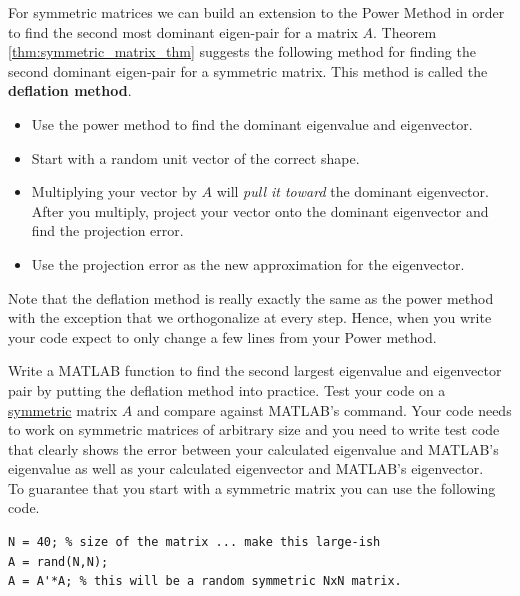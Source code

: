\begin{problem}
    For symmetric matrices we can build an extension to the Power Method in order
    to find the second most dominant eigen-pair for a matrix $A$.  Theorem
    \ref{thm:symmetric_matrix_thm} suggests the following method for finding the second
    dominant eigen-pair for a symmetric matrix.  This method is called the {\bf deflation
    method}.
    \begin{itemize}
        \item Use the power method to find the dominant eigenvalue and eigenvector.
        \item Start with a random unit vector of the correct shape.
        \item Multiplying your vector by $A$ will {\it pull it toward} the dominant
            eigenvector.  After you multiply, project your vector onto the dominant
            eigenvector and find the projection error.  
        \item Use the projection error as the new approximation for the eigenvector.
    \end{itemize}    

    Note that the deflation method is really exactly the same as the power method with the
    exception that we orthogonalize at every step.  Hence, when you write your code expect
    to only change a few lines from your Power method.

    Write a
    MATLAB function  to find the second largest eigenvalue and
    eigenvector pair by putting the deflation method into practice. Test your code on a
    \underline{symmetric} matrix $A$ and compare against MATLAB's  command.
    Your code needs to work on symmetric matrices of arbitrary size and you need to write
    test code that clearly shows the error between your calculated eigenvalue and MATLAB's
    eigenvalue as well as your calculated eigenvector and MATLAB's eigenvector.\\ To
    guarantee that you start with a symmetric matrix you can use the following code.
\begin{lstlisting}
N = 40; % size of the matrix ... make this large-ish
A = rand(N,N);
A = A'*A; % this will be a random symmetric NxN matrix.
\end{lstlisting}
\end{problem}
